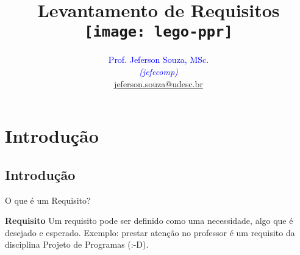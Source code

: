 \documentclass[xcolor=x11names,compress]{beamer}
\begin{document}
\title[Levantamento de Requisitos \hskip35mm \insertframenumber / \inserttotalframenumber  \hskip32mm \inserttitlegraphic]{Levantamento de Requisitos \\[4mm]
\texttt{[image: lego-ppr]}}
\author[@2018 Prof. Jeferson Souza, MSc (jefecomp) - All rights reserved.]{
	\textcolor{blue}{Prof. Jeferson Souza, MSc.} \\[1mm] 
	\textcolor{blue}{\textit{{\footnotesize (jefecomp) }}}\\[1.5mm]
	 \underline{{\footnotesize jeferson.souza@udesc.br}}
	 \vspace*{1mm}
}

\date{}


\begin{frame}
\titlepage
\end{frame}

\section{Introdução}
\subsection{Introdução}
\begin{frame}{O que é um Requisito?}

\begin{alertblock}{\textbf{Requisito}}
Um requisito pode ser definido como uma necessidade, algo que é desejado e esperado. Exemplo: prestar atenção no professor é um requisito da disciplina Projeto de Programas (:-D).
\end{alertblock}

\end{frame}
\end{document}
